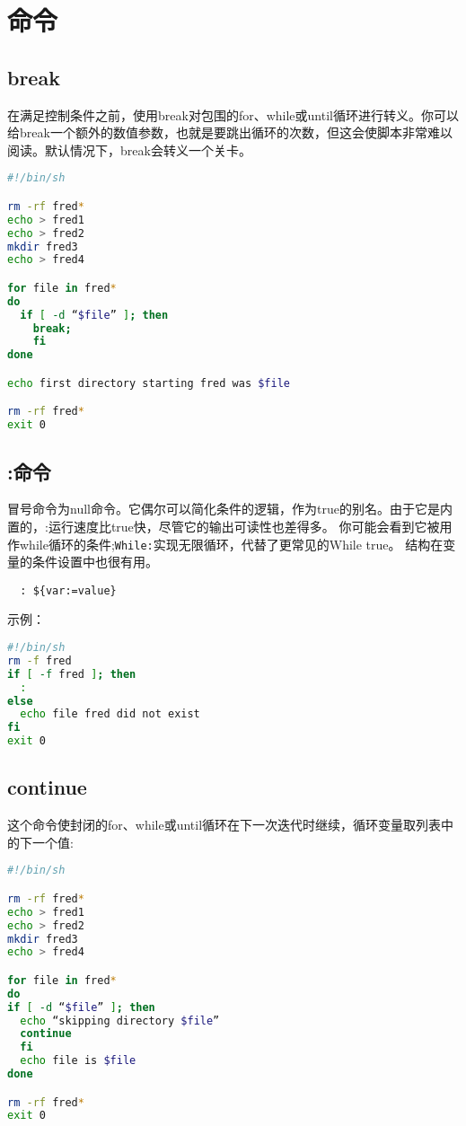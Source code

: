 \documentclass[a4paper]{ctexart}
\begin{document}
\section{命令}
\subsection{break}
在满足控制条件之前，使用break对包围的for、while或until循环进行转义。你可以给break一个额外的数值参数，也就是要跳出循环的次数，但这会使脚本非常难以阅读。默认情况下，break会转义一个关卡。
\begin{lstlisting}[language=sh]
#!/bin/sh

rm -rf fred*
echo > fred1
echo > fred2
mkdir fred3
echo > fred4

for file in fred*
do
  if [ -d “$file” ]; then
    break;
    fi
done

echo first directory starting fred was $file

rm -rf fred*
exit 0
\end{lstlisting}

\subsection{:命令}
冒号命令为null命令。它偶尔可以简化条件的逻辑，作为true的别名。由于它是内置的，:运行速度比true快，尽管它的输出可读性也差得多。 
你可能会看到它被用作while循环的条件;\texttt{While:}实现无限循环，代替了更常见的While true。 
结构在变量的条件设置中也很有用。
\begin{lstlisting}
  : ${var:=value}
\end{lstlisting}

示例：
\begin{lstlisting}[language=sh]
#!/bin/sh
rm -f fred
if [ -f fred ]; then
  :
else
  echo file fred did not exist
fi
exit 0
\end{lstlisting}

\subsection{continue}
这个命令使封闭的for、while或until循环在下一次迭代时继续，循环变量取列表中的下一个值:
\begin{lstlisting}[language=sh]
#!/bin/sh

rm -rf fred*
echo > fred1
echo > fred2
mkdir fred3
echo > fred4

for file in fred*
do
if [ -d “$file” ]; then
  echo “skipping directory $file”
  continue
  fi
  echo file is $file
done

rm -rf fred*
exit 0
\end{lstlisting}
\end{document}

